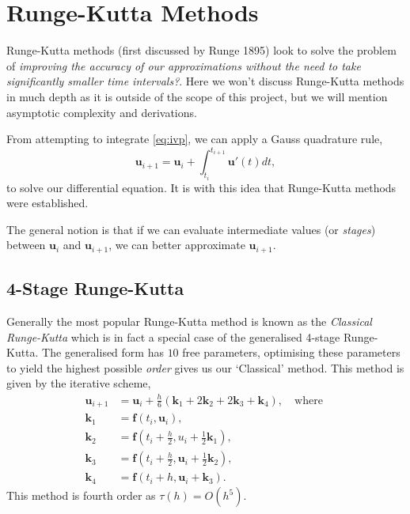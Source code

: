 \documentclass[12pt, twoside]{report}
\theoremstyle{plain}
\theoremstyle{definition}
\theoremstyle{definition}
\begin{document}
    \section{Runge-Kutta Methods}
    \label{2_runge_kutta}
        Runge-Kutta methods (first discussed by Runge 1895) look to solve the 
        problem of \textit{improving the accuracy of our approximations 
        without the need to take significantly smaller time intervals?}. Here 
        we won't discuss Runge-Kutta methods in much depth as it is outside of 
        the scope of this project, but we will mention asymptotic complexity 
        and derivations.

        From attempting to integrate \eqref{eq:ivp}, we can apply a Gauss quadrature rule,
        \begin{equation}
        \label{eq:fundamental_theorem_calculus}
            \mathbf{u}_{i+1} = \mathbf{u}_i + \int_{t_i}^{t_{i+1}} 
            \mathbf{u}'(t) dt,
        \end{equation}
        to solve our differential equation. It is with this idea that Runge-Kutta methods were established.

        The general notion is that if we can evaluate intermediate values 
        (or \textit{stages}) between $\mathbf{u}_i$ and $\mathbf{u}_{i+1}$, we can better approximate $\mathbf{u}_{i+1}$. 

        \subsection{4-Stage Runge-Kutta}
        \label{2_rk4}
            Generally the most popular Runge-Kutta method is known as the 
            \textit{Classical Runge-Kutta} which is in fact a special case of 
            the generalised 4-stage Runge-Kutta. The generalised form has $10$
            free parameters, optimising these parameters to yield the highest 
            possible \textit{order} gives us our `Classical' method. This 
            method is given by the iterative scheme,
            \begin{equation}
            \label{eq:rk4}
                \begin{split}
                    \mathbf{u}_{i+1} &= \mathbf{u}_i + 
                    \frac{h}{6} (\mathbf{k}_1 + 2\mathbf{k}_2 + 2\mathbf{k}_3 
                    + \mathbf{k}_4), \quad 
                    \text{where }\\
                    \mathbf{k}_1 &= \mathbf{f}(t_i, \mathbf{u}_i),\\
                    \mathbf{k}_2 &= \mathbf{f}(t_i+\frac{h}{2}, 
                    u_i+\frac{1}{2}\mathbf{k}_1),\\
                    \mathbf{k}_3 &= \mathbf{f}(t_i+\frac{h}{2}, 
                    \mathbf{u}_i+\frac{1}{2}\mathbf{k}_2),\\
                    \mathbf{k}_4 &= \mathbf{f}(t_i+h, 
                    \mathbf{u}_i+\mathbf{k}_3).
                \end{split}
            \end{equation}
            This method is fourth order as $\tau(h)=O(h^5)$. 
\end{document}
